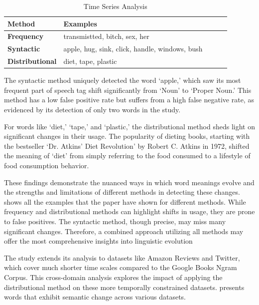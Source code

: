 \begin{table}[tbh]
\begin{tabular}{@{}lllll@{}}
\toprule
\textbf{Method}         & \textbf{Examples}                              &  &  &  \\ \midrule
\textbf{Frequency}      & transmistted, bitch, sex, her                  &  &  &  \\
\textbf{Syntactic}      & apple, hug, sink, click, handle, windows, bush &  &  &  \\
\textbf{Distributional} & diet, tape, plastic                            &  &  &  \\ \bottomrule
\end{tabular}
\caption{Time Series Analysis}
\label{tab:time-series-examples}
\end{table}
\raggedbottom

The syntactic method uniquely detected the word `apple,' which saw its most frequent part of speech tag shift significantly from `Noun' to `Proper Noun.'
This method has a low false positive rate but suffers from a high false negative rate, as evidenced by its detection of only two words in the study.

For words like `diet,' `tape,' and `plastic,' the distributional method sheds light on significant changes in their usage.
The popularity of dieting books, starting with the bestseller `Dr. Atkins’ Diet Revolution' by Robert C. Atkins in 1972, shifted the meaning of `diet' from simply referring to the food consumed to a lifestyle of food consumption behavior.

These findings demonstrate the nuanced ways in which word meanings evolve and the strengths and limitations of different methods in detecting these changes.
 shows all the examples that the paper have shown for different methods.
While frequency and distributional methods can highlight shifts in usage, they are prone to false positives.
The syntactic method, though precise, may miss many significant changes.
Therefore, a combined approach utilizing all methods may offer the most comprehensive insights into linguistic evolution

The study extends its analysis to datasets like Amazon Reviews and Twitter, which cover much shorter time scales compared to the Google Books Ngram Corpus.
This cross-domain analysis explores the impact of applying the distributional method on these more temporally constrained datasets.
 presents words that exhibit semantic change across various datasets.

